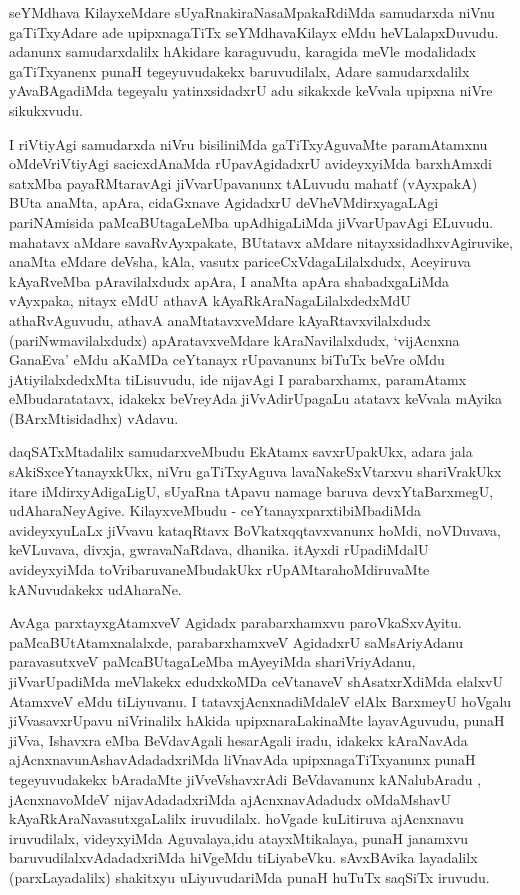 \begin{artha}
 seYMdhava KilayxeMdare sUyaRnakiraNasaMpakaRdiMda samudarxda niVnu
 gaTiTxyAdare ade upipxnagaTiTx seYMdhavaKilayx eMdu
 heVLalapxDuvudu. adanunx samudarxdalilx hAkidare karaguvudu, karagida
 meVle modalidadx gaTiTxyanenx punaH tegeyuvudakekx baruvudilalx,
 Adare samudarxdalilx yAvaBAgadiMda tegeyalu yatinxsidadxrU adu
 sikakxde keVvala upipxna niVre sikukxvudu.

I riVtiyAgi samudarxda niVru bisiliniMda gaTiTxyAguvaMte  paramAtamxnu
oMdeVriVtiyAgi sacicxdAnaMda rUpavAgidadxrU avideyxyiMda barxhAmxdi
satxMba payaRMtaravAgi jiVvarUpavanunx tALuvudu mahatf (vAyxpakA) BUta
anaMta, apAra, cidaGxnave AgidadxrU deVheVMdirxyagaLAgi pariNAmisida
paMcaBUtagaLeMba upAdhigaLiMda jiVvarUpavAgi ELuvudu. mahatavx aMdare
savaRvAyxpakate, BUtatavx aMdare nitayxsidadhxvAgiruvike, anaMta
eMdare deVsha, kAla, vasutx pariceCxVdagaLilalxdudx, Aceyiruva
kAyaRveMba pAravilalxdudx apAra, I anaMta apAra shabadxgaLiMda
vAyxpaka, nitayx eMdU athavA kAyaRkAraNagaLilalxdedxMdU athaRvAguvudu,
athavA anaMtatavxveMdare kAyaRtavxvilalxdudx (pariNwmavilalxdudx)
apAratavxveMdare kAraNavilalxdudx, `vijAcnxna GanaEva' eMdu aKaMDa ceYtanayx
rUpavanunx biTuTx beVre oMdu jAtiyilalxdedxMta tiLisuvudu, ide
nijavAgi I parabarxhamx, paramAtamx eMbudaratatavx, idakekx beVreyAda
jiVvAdirUpagaLu atatavx keVvala mAyika (BArxMtisidadhx) vAdavu. 

daqSATxMtadalilx samudarxveMbudu EkAtamx savxrUpakUkx, adara jala
sAkiSxceYtanayxkUkx, niVru gaTiTxyAguva lavaNakeSxVtarxvu shariVrakUkx
itare iMdirxyAdigaLigU, sUyaRna tApavu namage baruva devxYtaBarxmegU,
udAharaNeyAgive. KilayxveMbudu - ceYtanayxparxtibiMbadiMda avideyxyuLaLx
jiVvavu kataqRtavx BoVkatxqqtavxvanunx hoMdi,  noVDuvava, keVLuvava,
divxja, gwravaNaRdava, dhanika. itAyxdi rUpadiMdalU avideyxyiMda
toVribaruvaneMbudakUkx rUpAMtarahoMdiruvaMte kANuvudakekx udAharaNe.

AvAga parxtayxgAtamxveV Agidadx parabarxhamxvu
paroVkaSxvAyitu. paMcaBUtAtamxnalalxde, parabarxhamxveV AgidadxrU
saMsAriyAdanu paravasutxveV paMcaBUtagaLeMba mAyeyiMda shariVriyAdanu,
jiVvarUpadiMda meVlakekx edudxkoMDa ceVtanaveV shAsatxrXdiMda elalxvU AtamxveV
eMdu tiLiyuvanu. I tatavxjAcnxnadiMdaleV elAlx BarxmeyU hoVgalu
jiVvasavxrUpavu niVrinalilx hAkida upipxnaraLakinaMte layavAguvudu,
punaH jiVva, Ishavxra eMba BeVdavAgali hesarAgali iradu, idakekx
kAraNavAda ajAcnxnavunAshavAdadadxriMda liVnavAda
upipxnagaTiTxyanunx punaH tegeyuvudakekx bAradaMte jiVveVshavxrAdi
BeVdavanunx kANalubAradu , jAcnxnavoMdeV nijavAdadadxriMda
ajAcnxnavAdadudx oMdaMshavU kAyaRkAraNavasutxgaLalilx
iruvudilalx. hoVgade kuLitiruva ajAcnxnavu iruvudilalx, videyxyiMda
Aguvalaya,idu atayxMtikalaya, punaH janamxvu baruvudilalxvAdadadxriMda
hiVgeMdu tiLiyabeVku. sAvxBAvika layadalilx (parxLayadalilx) shakitxyu
uLiyuvudariMda punaH huTuTx saqSiTx iruvudu.
\end{artha}


